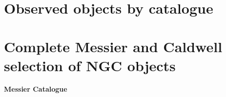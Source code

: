 \documentclass[10pt,twoside,a4paper,english]{article}
\begin{document}
\small
\section{Observed objects by catalogue}
\vspace{4 mm}
\hspace{4 mm}

\clearpage 

\clearpage 

\clearpage 

\clearpage 

\clearpage 

\clearpage 

\clearpage 
\clearpage 
 
\small 
\noindent 
 
\section{Complete Messier and Caldwell selection of NGC objects} 
\vspace{4 mm} 
\hspace{4 mm} 
{\bf Messier Catalogue} 
\end{document}
